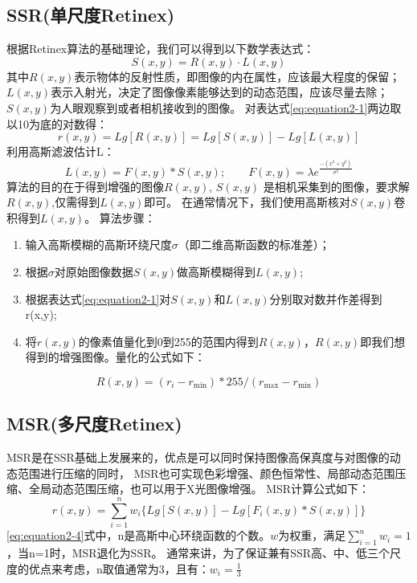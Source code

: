 \documentclass[lang=cn,newtx,10pt,scheme=chinese]{elegantbook}
\begin{document}
    \subsection{SSR(单尺度Retinex)}\label{subsec:ssr(retinex)}
    根据Retinex算法的基础理论，我们可以得到以下数学表达式：
    \begin{equation}
        S(x, y) = R(x, y) \cdot L(x, y)\label{eq:equation2-1}
    \end{equation}
    其中$R(x, y)$表示物体的反射性质，即图像的内在属性，应该最大程度的保留；$L(x,y)$表示入射光，决定了图像像素能够达到的动态范围，应该尽量去除；
    $S(x,y)$为人眼观察到或者相机接收到的图像。
    对表达式\ref{eq:equation2-1}两边取以10为底的对数得：
    \begin{equation}
        r(x,y) = Lg[R(x,y)] = Lg[S(x, y)] - Lg[L(x,y)]\label{eq:equation2-2}
    \end{equation}
    利用高斯滤波估计L：
    \begin{equation}
        L(x,y) = F(x,y) \ast S(x,y);\qquad F(x,y) = \lambda e^{\frac{-(x^2+y^2)}{\sigma ^2}}\label{eq:equation2-9}
    \end{equation}
    算法的目的在于得到增强的图像$R(x,y)$, $S(x,y)$ 是相机采集到的图像，要求解$R(x,y)$,仅需得到$L(x,y)$即可。
    在通常情况下，我们使用高斯核对$S(x,y)$卷积得到$L(x,y)$。
    算法步骤：
    \begin{enumerate}
        \item 输入高斯模糊的高斯环绕尺度$\sigma$（即二维高斯函数的标准差）；
        \item 根据$\sigma$对原始图像数据$S(x,y)$做高斯模糊得到$L(x,y)$;
        \item 根据表达式\ref{eq:equation2-1}对$S(x,y)$和$L(x,y)$分别取对数并作差得到r(x,y);
        \item 将$r(x,y)$的像素值量化到0到255的范围内得到$R(x,y)$，$R(x,y)$即我们想得到的增强图像。量化的公式如下：
    \end{enumerate}
    \begin{equation}
        R(x,y) = (r_i-r_{\min})*255/(r_{\max}-r_{\min})\label{eq:equation2-3}
    \end{equation}

    \subsection{MSR(多尺度Retinex)}\label{subsec:msr(retinex)}
    MSR是在SSR基础上发展来的，优点是可以同时保持图像高保真度与对图像的动态范围进行压缩的同时，
    MSR也可实现色彩增强、颜色恒常性、局部动态范围压缩、全局动态范围压缩，也可以用于X光图像增强。
    MSR计算公式如下：
    \begin{equation}
        r(x,y) = \sum_{i=1}^{n} w_i \{Lg[S(x,y)] - Lg[F_i(x,y) \ast S(x,y)]\} \label{eq:equation2-4}
    \end{equation}
    \ref{eq:equation2-4}式中，n是高斯中心环绕函数的个数。$w$为权重，满足$\sum_{i=1}^{n} w_i=1$，当n=1时，MSR退化为SSR。
    通常来讲，为了保证兼有SSR高、中、低三个尺度的优点来考虑，n取值通常为3，且有：$w_i=\frac{1}{3}$
\end{document}
